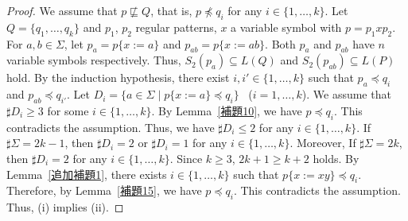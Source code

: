 \begin{proof}
    We assume that $p \not\sqsubseteq Q$, that is, $p \not\preceq q_{i}$
    for any $i \in \{1,\ldots,k\}$.
    Let $Q = \{q_{1},\ldots,q_{k}\}$ and
    $p_{1}$, $p_{2}$ regular patterns, $x$ a variable symbol with
    $p = p_{1}xp_{2}$.
    For $a, b \in \Sigma$,
    let $p_{a}=p\{x:=a\}$ and $p_{ab}=p\{x:=ab\}$.
    Both $p_{a}$ and $p_{ab}$ have $n$ variable symbols respectively.
    Thus, $S_{2}(p_{a}) \subseteq L(Q)$ and $S_{2}(p_{ab}) \subseteq L(P)$ hold.
    By the induction hypothesis,
    there exist $i, i' \in \{1,\ldots,k\}$ such that
    $p_{a} \preceq q_{i}$ and $p_{ab} \preceq q_{i'}$.
    Let $D_{i} = \{a \in \Sigma \mid p\{x:=a\} \preceq q_{i}\}$ \ ($i=1,\ldots,k$).
    We assume that $\sharp D_{i} \geq 3$ for some $i \in \{1,\ldots, k\}$.
    By Lemma~\ref{補題10}, we have $p \preceq q_{i}$.
    This contradicts the assumption.
    Thus, we have $\sharp D_{i} \leq 2$ for any $i \in \{1,\ldots,k\}$.
    If $\sharp\Sigma = 2k-1$, then
    $\sharp D_{i}=2$ or $\sharp D_{i}=1$ for any $i \in \{1,\ldots,k\}$.
    Moreover,
    If $\sharp\Sigma = 2k$, then
    $\sharp D_{i}=2$ for any $i \in \{1,\ldots,k\}$.
    Since $k \geq 3$, $2k+1 \geq k+2$ holds.
    By Lemma~\ref{追加補題1},
    there exists $i \in \{1,\ldots,k\}$ such that $p\{x:=xy\} \preceq q_{i}$.
    Therefore, by Lemma~\ref{補題15}, we have $p \preceq q_{i}$.
    This contradicts the assumption.
    Thus, (i) implies (ii).
\end{proof}

